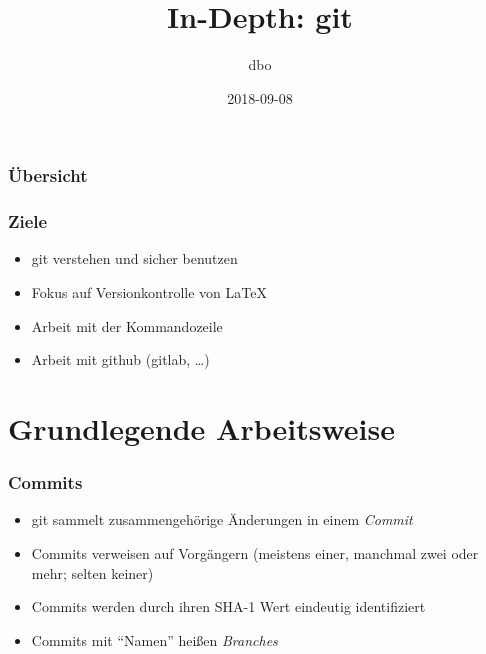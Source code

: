 \documentclass{cms-kurs}
\begin{document}
\title{In-Depth: git}
\author{dbo}
\date{2018-09-08}

\maketitle

\begin{frame}
  \frametitle{Übersicht}
  \tableofcontents{}
\end{frame}

\begin{frame}
  \frametitle{Ziele}

  \onslide<+->

  \begin{itemize}
  \item git verstehen und sicher benutzen
  \item Fokus auf Versionkontrolle von \LaTeX{}
  \item Arbeit mit der Kommandozeile
  \item Arbeit mit github (gitlab, …)
  \end{itemize}

\end{frame}

\section{Grundlegende Arbeitsweise}

\begin{frame}[fragile]
  \frametitle{Commits}

  \onslide<+->

  \begin{itemize}
  \item git sammelt zusammengehörige Änderungen in einem \emph{Commit}
  \item Commits verweisen auf Vorgängern (meistens einer, manchmal zwei oder
    mehr; selten keiner)
  \item Commits werden durch ihren SHA-1 Wert eindeutig identifiziert
  \item Commits mit \enquote{Namen} heißen \emph{Branches}
  \end{itemize}

  \begin{center}
  \end{center}

\end{frame}
\end{document}
